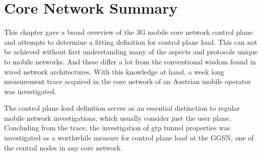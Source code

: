

















\section{Core Network Summary}
\label{c4:sec:conclusion}

This chapter gave a broad overview of the \gls{3G} mobile core network control plane and attempts to determine a fitting definition for control plane load. This can not be achieved without first understanding many of the aspects and protocols unique to mobile networks. And these differ a lot from the conventional wisdom found in wired network architectures. With this knowledge at hand, a week long measurement trace acquired in the core network of an Austrian mobile operator was investigated. 

The control plane load definition serves as an essential distinction to regular mobile network investigations, which usually consider just the user plane. Concluding from the trace, the investigation of \gls{gtp} tunnel properties was investigated as a worthwhile measure for control plane load at the \gls{GGSN}, one of the central nodes in any core network.

